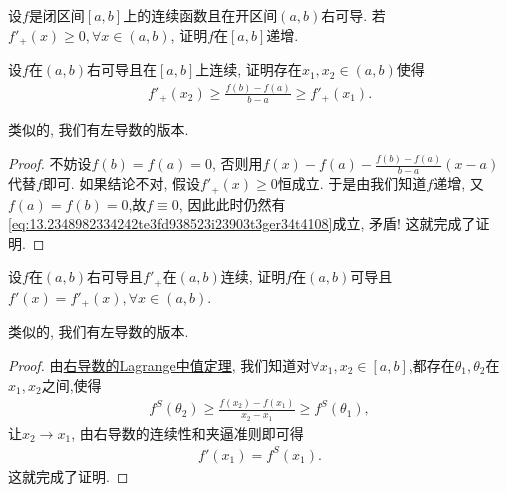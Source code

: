 \documentclass[../../main.tex]{subfiles}%
\begin{document}
\begin{corollary}[右可导函数非负则递增]\label{corollary:右可导函数非负则递增}
设$f$是闭区间$[a,b]$上的连续函数且在开区间$(a,b)$右可导. 若$f'_+(x) \geqslant 0, \forall x \in (a,b)$, 证明$f$在$[a,b]$递增.
\end{corollary}

\begin{theorem}[右导数的Lagrange中值定理]\label{theorem:右导数的Lagrange中值定理}
设$f$在$(a,b)$右可导且在$[a,b]$上连续, 证明存在$x_1,x_2 \in (a,b)$使得
\begin{align}
f'_+(x_2) \geqslant \frac{f(b) - f(a)}{b - a} \geqslant f'_+(x_1). \label{eq:13.2348982334242te3fd938523i23903t3ger34t4108}
\end{align}
\end{theorem}
\begin{note}
类似的, 我们有左导数的版本.
\end{note}
\begin{proof}

不妨设$f(b) = f(a) = 0$, 否则用$f(x) - f(a) - \frac{f(b)-f(a)}{b - a}(x - a)$代替$f$即可.
如果结论不对, 假设$f'_+(x) \geqslant 0$恒成立. 于是由我们知道$f$递增, 又$f(a)=f(b)=0$,故$f \equiv 0$, 因此此时仍然有\eqref{eq:13.2348982334242te3fd938523i23903t3ger34t4108}成立, 矛盾! 这就完成了证明.

\end{proof}

\begin{proposition}[右导数连续则原函数可导]\label{proposition:右导数连续则原函数可导}
设$f$在$(a,b)$右可导且$f'_+$在$(a,b)$连续, 证明$f$在$(a,b)$可导且$f'(x) = f'_+(x), \forall x \in (a,b)$.
\end{proposition}
\begin{note}
类似的, 我们有左导数的版本.
\end{note}
\begin{proof}

由\hyperref[theorem:右导数的Lagrange中值定理]{右导数的Lagrange中值定理}, 我们知道对$\forall x_1,x_2\in [a,b]$,都存在$\theta_1,\theta_2$在$x_1,x_2$之间,使得
\begin{align*}
f^S(\theta_2) \geqslant \frac{f(x_2) - f(x_1)}{x_2 - x_1} \geqslant f^S(\theta_1),
\end{align*}
让$x_2 \to x_1$, 由右导数的连续性和夹逼准则即可得
\begin{align*}
f'(x_1) = f^S(x_1).
\end{align*}
这就完成了证明.

\end{proof}
\end{document}
